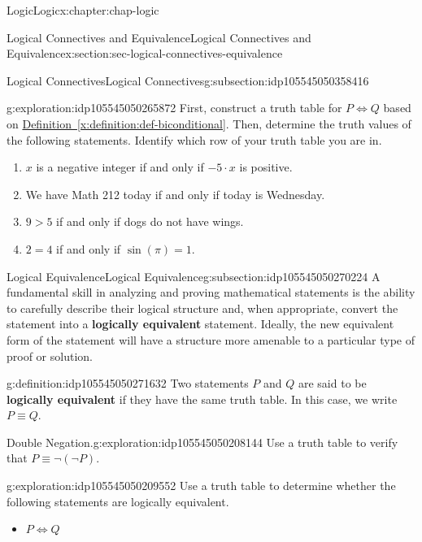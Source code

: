 \documentclass[oneside,10pt,]{book}
\newcommand{\xreffont}{\relax}
\newcommand{\terminology}[1]{\textbf{#1}}
\begin{document}
\begin{chapterptx}{Logic}{}{Logic}{}{}{x:chapter:chap-logic}
\begin{sectionptx}{Logical Connectives and Equivalence}{}{Logical Connectives and Equivalence}{}{}{x:section:sec-logical-connectives-equivalence}
\begin{subsectionptx}{Logical Connectives}{}{Logical Connectives}{}{}{g:subsection:idp105545050358416}
\begin{exploration}{}{g:exploration:idp105545050265872}%
First, construct a truth table for \(P\Leftrightarrow Q\) based on \hyperref[x:definition:def-biconditional]{Definition~{\xreffont\ref{x:definition:def-biconditional}}}. Then, determine the truth values of the following statements. Identify which row of your truth table you are in.%
%
\begin{enumerate}
\item{}\(x\) is a negative integer if and only if \(-5\cdot x\) is positive.%
\item{}We have Math 212 today if and only if today is Wednesday.%
\item{}\(9 > 5\) if and only if dogs do not have wings.%
\item{}\(2=4\) if and only if \(\sin(\pi) = 1\).%
\end{enumerate}
\end{exploration}%
\end{subsectionptx}
%
%
\typeout{************************************************}
\typeout{************************************************}
%
\begin{subsectionptx}{Logical Equivalence}{}{Logical Equivalence}{}{}{g:subsection:idp105545050270224}
A fundamental skill in analyzing and proving mathematical statements is the ability to carefully describe their logical structure and, when appropriate, convert the statement into a \terminology{logically equivalent} statement. Ideally, the new equivalent form of the statement will have a structure more amenable to a particular type of proof or solution.%
\begin{definition}{}{g:definition:idp105545050271632}%
%
Two statements \(P\) and \(Q\) are said to be \terminology{logically equivalent} if they have the same truth table. In this case, we write \(P \equiv Q\).%
\end{definition}
\begin{exploration}{Double Negation.}{g:exploration:idp105545050208144}%
Use a truth table to verify that \(P\equiv \neg (\neg P)\).%
\end{exploration}%
\begin{exploration}{}{g:exploration:idp105545050209552}%
Use a truth table to determine whether the following statements are logically equivalent.%
%
\begin{itemize}[label=\textbullet]
\item{}\(\displaystyle P\Leftrightarrow Q\)%

\end{itemize}
\end{exploration}
\end{subsectionptx}
\end{sectionptx}
\end{chapterptx}
\end{document}
